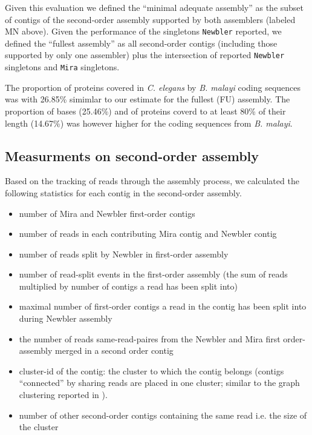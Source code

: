 \documentclass[12pt,a4paper]{article}
\begin{document}
Given this evaluation we defined the ``minimal adequate assembly'' as
the subset of contigs of the second-order assembly supported by both
assemblers (labeled MN above). Given the performance of the singletons
\texttt{Newbler} reported, we defined the ``fullest assembly'' as all
second-order contigs (including those supported by only one assembler)
plus the intersection of reported \texttt{Newbler} singletons and
\texttt{Mira} singletons.

The proportion of proteins covered in \textit{C. elegans} by
\textit{B. malayi} coding sequences was with
26.85\% simimlar to our estimate for
the fullest (FU) assembly. The proportion of bases
(25.46\%) and of proteins coverd to
at least 80\% of their length
(14.67\%) was however higher for
the coding sequences from \textit{B. malayi}.

\subsection{Measurments on second-order assembly}

Based on the tracking of reads through the assembly process, we
calculated the following statistics for each contig in the
second-order assembly.

\begin{itemize}
\item number of Mira and Newbler first-order contigs
\item number of reads in each contributing Mira contig and Newbler
  contig
\item number of reads split by Newbler in first-order assembly
\item number of read-split events in the first-order assembly (the sum
  of reads multiplied by number of contigs a read has been split into)
\item maximal number of first-order contigs a read in the contig has
  been split into during Newbler assembly
\item the number of reads same-read-paires from the Newbler and Mira
  first order-assembly merged in a second order contig
\item cluster-id of the contig: the cluster to which the contig
  belongs (contigs ``connected'' by sharing reads are placed in one
  cluster; similar to the graph clustering reported in
  \cite{pmid21138572}).
\item number of other second-order contigs containing the same read
  i.e. the size of the cluster
\end{itemize}
\end{document}
